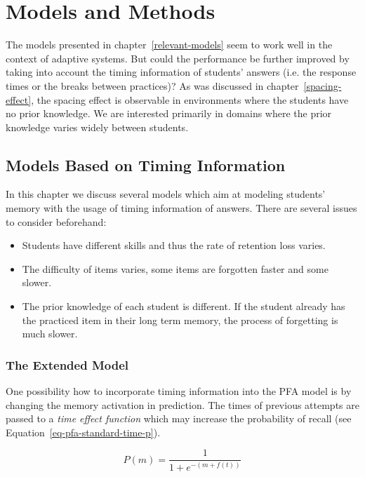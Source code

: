 \chapter{Models and Methods}

The models presented in chapter~\ref{relevant-models} seem to work well in the context of adaptive systems. But could the performance be further improved by taking into account the timing information of students' answers (i.e. the response times or the breaks between practices)? As was discussed in chapter~\ref{spacing-effect}, the spacing effect is observable in environments where the students have no prior knowledge. We are interested primarily in domains where the prior knowledge varies widely between students.

\section{Models Based on Timing Information}

In this chapter we discuss several models which aim at modeling students' memory with the usage of timing information of answers. There are several issues to consider beforehand:

\begin{itemize}
  \item Students have different skills and thus the rate of retention loss varies.
  \item The difficulty of items varies, some items are forgotten faster and some slower.
  \item The prior knowledge of each student is different. If the student already has the practiced item in their long term memory, the process of forgetting is much slower.
\end{itemize}

\subsection{The Extended Model}

One possibility how to incorporate timing information into the PFA model is by changing the memory activation in prediction. The times of previous attempts are passed to a \textit{time effect function} which may increase the probability of recall (see Equation~\ref{eq-pfa-standard-time-p}).

\begin{equation} \label{eq-pfa-standard-time-p}
  P(m) = \frac{1}{1 + e^{-(m + f(t))}}
\end{equation}

